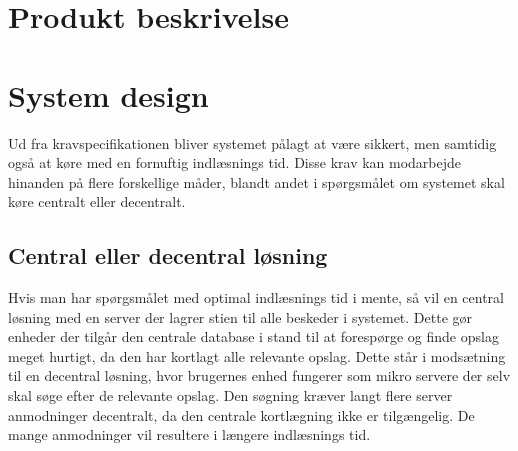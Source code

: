 \section{Produkt beskrivelse}


\section{System design}
Ud fra kravspecifikationen bliver systemet pålagt at være sikkert, men samtidig også at køre med en fornuftig indlæsnings tid. Disse krav kan  modarbejde hinanden på flere forskellige måder, blandt andet i spørgsmålet om systemet skal køre centralt eller decentralt.

\subsection{Central eller decentral løsning}
Hvis man har spørgsmålet med optimal indlæsnings tid i mente, så vil en central løsning med en server der lagrer stien til alle beskeder i systemet. Dette gør enheder der tilgår den centrale database i stand til at forespørge og finde opslag meget hurtigt, da den har kortlagt alle relevante opslag. Dette står i modsætning til en decentral løsning, hvor brugernes enhed fungerer som mikro servere der selv skal søge efter de relevante opslag. Den søgning kræver langt flere server anmodninger decentralt, da den centrale kortlægning ikke er tilgængelig. De mange anmodninger vil resultere i længere indlæsnings tid.

